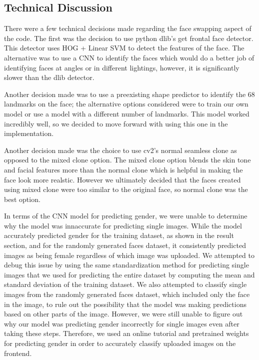 \subsection{Technical Discussion}


There were a few technical decisions made regarding the face swapping aspect of the code.
The first was the decision to use python dlib's get frontal face detector. This detector uses HOG + Linear SVM
to detect the features of the face. The alternative was to use a CNN to identify the faces which would do a better
job of identifying faces at angles or in different lightings, however, it is significantly slower than the dlib detector.

Another decision made was to use a preexisting shape predictor to identify the 68 landmarks on the face; the alternative options
considered were to train our own model or use a model with a different number of landmarks. This model worked incredibly well, so
we decided to move forward with using this one in the implementation.

Another decision made was the choice to use cv2's normal seamless clone as opposed to the mixed clone option. The mixed clone option
blends the skin tone and facial features more than the normal clone which is helpful in making the face look more realstic.
However we ultimately decided that the faces created using mixed clone were too similar to the original face, so normal
clone was the best option.

In terms of the CNN model for predicting gender, we were unable to determine why the model was innaccurate for predicting single images. While
the model accurately predicted gender for the training dataset, as shown in the result section, and for the randomly generated faces dataset,
it consistently predicted images as being female regardless of which image was uploaded. We attempted to debug this issue by using the same standardization
method for predicting single images that we used for predicting the entire dataset by computing the mean and standard deviation of the training dataset. We also
attempted to classify single images from the randomly generated faces dataset, which included only the face in the image, to rule out the possibility that the model
was making predictions based on other parts of the image. However, we were still unable to figure out why our model was predicting gender incorrectly for single images
even after taking these steps. Therefore, we used an online tutorial and pretrained weights for predicting gender in order to accurately classify
uploaded images on the frontend.

